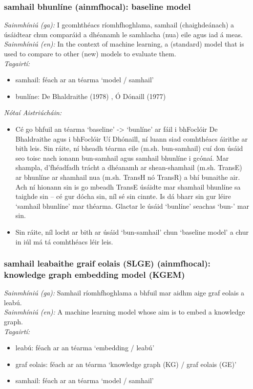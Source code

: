 \documentclass{article}
\begin{document}
\subsubsection*{samhail bhunlíne (ainmfhocal): baseline model}
 \noindent \textit{Sainmhíniú (ga):} I gcomhthéacs ríomhfhoghlama, samhail (chaighdeánach) a úsáidtear chun comparáid a dhéanamh le samhlacha (nua) eile agus iad á meas.
\\
 \noindent \textit{Sainmhíniú (en):} In the context of machine learning, a (standard) model that is used to compare to other (new) models to evaluate them.
\\
 \noindent \textit{Tagairtí:}
\begin{itemize}
	\item samhail: féach ar an téarma `model / samhail'
	\item bunlíne: De Bhaldraithe (1978) \cite{de-bhaldraithe}, Ó Dónaill (1977) \cite{odonaill}
\end{itemize}

 \noindent \textit{Nótaí Aistriúcháin:}
\begin{itemize}
	\item Cé go bhfuil an téarma `baseline' -> `bunlíne' ar fáil i bhFoclóir De Bhaldraithe agus i bhFoclóir Uí Dhónaill, ní luann siad comhthéacs áirithe ar bith leis. Sin ráite, ní bheadh téarma eile (m.sh. bun-samhail) cuí don úsáid seo toisc nach ionann bun-samhail agus samhail bhunlíne i gcónaí. Mar shampla, d'fhéadfadh trácht a dhéanamh ar shean-shamhail (m.sh. TransE) ar bhunlíne ar shamhail nua (m.sh. TransH nó TransR) a bhí bunaithe air. Ach ní hionann sin is go mbeadh TransE úsáidte mar shamhail bhunlíne sa taighde sin -- cé gur dócha sin, níl sé sin cinnte. Is dá bharr sin gur léire `samhail bhunlíne' mar théarma. Glactar le úsáid `bunlíne' seachas `bun-' mar sin.
	\item Sin ráite, níl locht ar bith ar úsáid `bun-samhail' chun `baseline model' a chur in iúl má tá comhthéacs léir leis.
\end{itemize}


\subsubsection*{samhail leabaithe graif eolais (SLGE) (ainmfhocal): knowledge graph embedding model (KGEM)}
 \noindent \textit{Sainmhíniú (ga):} Samhail ríomhfhoghlama a bhfuil mar aidhm aige graf eolais a leabú.
\\
 \noindent \textit{Sainmhíniú (en):} A machine learning model whose aim is to embed a knowledge graph.
\\
 \noindent \textit{Tagairtí:}
\begin{itemize}
	\item leabú: féach ar an téarma `embedding / leabú'
	\item graf eolais: féach ar an téarma `knowledge graph (KG) / graf eolais (GE)'
	\item samhail: féach ar an téarma `model / samhail'
\end{itemize}
\end{document}
